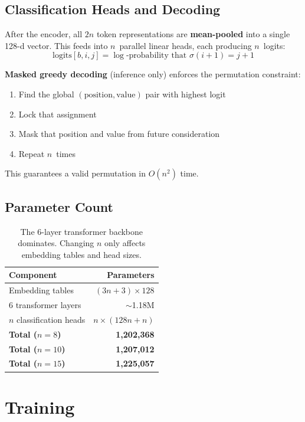 \documentclass[11pt,a4paper]{article}
\begin{document}
\subsection{Classification Heads and Decoding}

After the encoder, all $2n$ token representations are \textbf{mean-pooled} into a single 128-d vector. This feeds into $n$~parallel linear heads, each producing $n$~logits:
\[
\text{logits}[b, i, j] = \log\text{-probability that } \sigma(i{+}1) = j{+}1
\]

\textbf{Masked greedy decoding} (inference only) enforces the permutation constraint:
\begin{enumerate}[nosep]
    \item Find the global $(\text{position}, \text{value})$ pair with highest logit
    \item Lock that assignment
    \item Mask that position and value from future consideration
    \item Repeat $n$~times
\end{enumerate}
This guarantees a valid permutation in $O(n^2)$ time.

\subsection{Parameter Count}

\begin{table}[h]
\centering
\begin{tabular}{lr}
\toprule
Component & Parameters \\
\midrule
Embedding tables & $(3n + 3) \times 128$ \\
6 transformer layers & $\sim$1.18M \\
$n$ classification heads & $n \times (128n + n)$ \\
\midrule
\textbf{Total ($n{=}8$)} & \textbf{1,202,368} \\
\textbf{Total ($n{=}10$)} & \textbf{1,207,012} \\
\textbf{Total ($n{=}15$)} & \textbf{1,225,057} \\
\bottomrule
\end{tabular}
\caption{The 6-layer transformer backbone dominates. Changing $n$ only affects embedding tables and head sizes.}
\end{table}

\section{Training}
\end{document}
